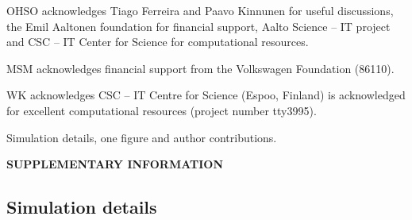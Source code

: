 \documentclass[journal=jacsat,manuscript=article]{achemso}
\begin{document}
\begin{acknowledgement}


OHSO acknowledges Tiago Ferreira and Paavo Kinnunen for useful discussions, 
the Emil Aaltonen foundation for financial support, 
Aalto Science -- IT project and CSC -- IT Center for Science for computational resources. 

MSM acknowledges financial support from the Volkswagen Foundation (86110).

WK acknowledges CSC -- IT Centre for Science (Espoo, Finland) is acknowledged for excellent computational resources (project number tty3995).

\end{acknowledgement}

\begin{suppinfo}

Simulation details, one figure and author contributions.


\end{suppinfo}



\newpage
\begin{center}
{\bf SUPPLEMENTARY INFORMATION}
\end{center}
\subsection{Simulation details} 
\end{document}
